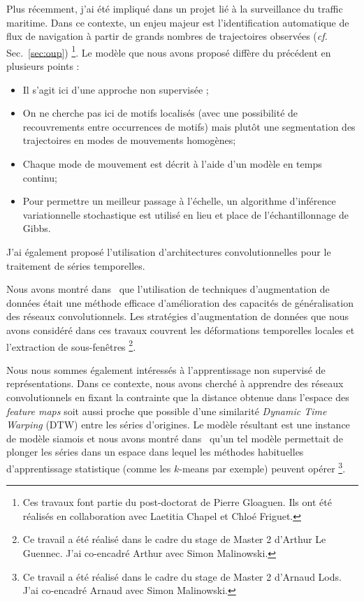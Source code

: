 Plus récemment, j'ai été impliqué dans un projet lié à la surveillance du
traffic maritime.
Dans ce contexte, un enjeu majeur est l'identification automatique de flux de
navigation à partir de grands nombres de trajectoires observées (\emph{cf.}
Sec.~\ref{sec:oup})%
\footnote{Ces travaux font partie du post-doctorat de Pierre Gloaguen.
Ils ont été réalisés en collaboration avec Laetitia Chapel et Chloé Friguet.}.
Le modèle que nous avons proposé diffère du précédent en plusieurs points :

\begin{itemize}
\item Il s'agit ici d'une approche non supervisée ;
\item On ne cherche pas ici de motifs localisés (avec une possibilité de
recouvrements entre occurrences de motifs) mais plutôt une segmentation
des trajectoires en modes de mouvements homogènes;
\item Chaque mode de mouvement est décrit à l'aide d'un modèle en temps continu;
\item Pour permettre un meilleur passage à l'échelle, un algorithme d'inférence
variationnelle stochastique est utilisé en lieu et place de l'échantillonnage
de Gibbs.
\end{itemize}

\haveabreak{}

J'ai également proposé l'utilisation d'architectures convolutionnelles pour le
traitement de séries temporelles.

Nous avons montré dans~\cite{leguennec:halshs-01357973} que l'utilisation de
techniques d'augmentation de données était une méthode efficace d'amélioration
des capacités de généralisation des réseaux convolutionnels.
Les stratégies d'augmentation de données que nous avons considéré dans ces
travaux couvrent les déformations temporelles locales et l'extraction de
sous-fenêtres%
\footnote{Ce travail a été réalisé dans le cadre du stage de Master 2 d'Arthur
Le Guennec.
J'ai co-encadré Arthur avec Simon Malinowski.}.

Nous nous sommes également intéressés à l'apprentissage non supervisé de
représentations.
Dans ce contexte, nous avons cherché à apprendre des réseaux convolutionnels
en fixant la contrainte que la distance obtenue dans l'espace des
\emph{feature maps} soit aussi proche que possible d'une similarité
\emph{Dynamic Time Warping} (DTW) entre les séries d'origines.
Le modèle résultant est une instance de modèle siamois et nous avons montré
dans~\cite{lods:hal-01565207} qu'un tel modèle permettait de plonger les séries
dans un espace dans lequel les méthodes habituelles d'apprentissage statistique
(comme les $k$-means par exemple) peuvent opérer%
\footnote{Ce travail a été réalisé dans le cadre du stage de Master 2 d'Arnaud
Lods.
J'ai co-encadré Arnaud avec Simon Malinowski.}.

